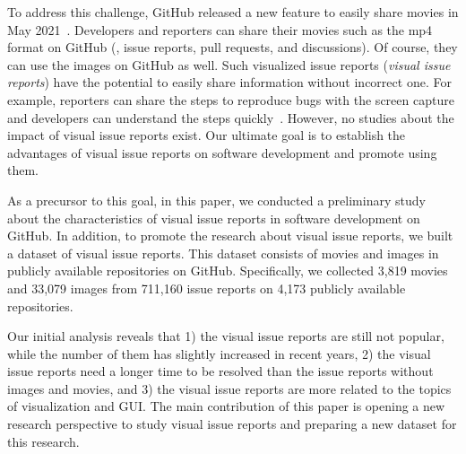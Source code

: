 To address this challenge, GitHub released a new feature 
to easily share movies in May 2021~\citep{github-video-blog}. 
Developers and reporters can share their movies such as the mp4 format 
on GitHub (\eg,  issue reports, pull requests, and discussions). 
Of course, they can use the images on GitHub as well. 
Such visualized issue reports (\textit{visual issue reports}) have the potential to 
easily share information without incorrect one.  
For example, reporters can share the steps to reproduce bugs 
with the screen capture and developers can understand 
the steps quickly~\citep{github-video-blog}.
However, no studies about the impact of visual issue reports exist. 
Our ultimate goal is to establish the advantages of visual issue reports 
on software development and promote using them.





As a precursor to this goal, in this paper, 
we conducted a preliminary study about the characteristics of 
visual issue reports in software development on GitHub. 
In addition, to promote the research about visual issue reports, 
we built a dataset of visual issue reports. 
This dataset consists of movies and images 
in publicly available repositories on GitHub. 
Specifically, we collected 
3,819 movies and 
33,079 images from 
711,160 issue reports on
4,173 publicly available repositories.

Our initial analysis reveals that 
1) the visual issue reports are still not popular,
while the number of them has slightly increased in recent years, 
2) the visual issue reports need 
a longer time to be resolved than the issue reports without images and movies, and 
3) the visual issue reports are more related to 
the topics of visualization and GUI. 
The main contribution of this paper is 
opening a new research perspective to study visual issue reports
and preparing a new dataset for this research. 